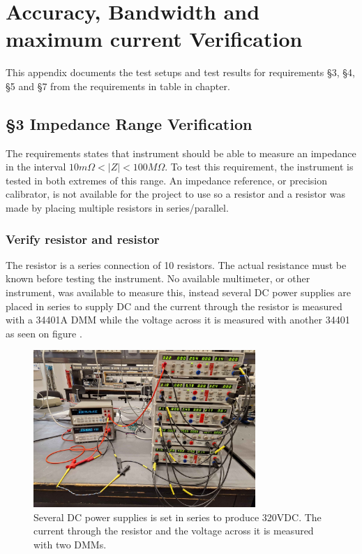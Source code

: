\chapter{Accuracy, Bandwidth and maximum current Verification} \label{App:AccuracyBWTest}
This appendix documents the test setups and test results for requirements §3, §4, §5 and §7 from the requirements in table  in chapter.

\section{§3 Impedance Range Verification} \label{subsec:ZRangeVerify} 
The requirements states that instrument should be able to measure an impedance in the interval $10m\Omega < |Z| < 100M \Omega$. To test this requirement, the instrument is tested in both extremes of this range. An impedance reference, or precision calibrator, is not available for the project to use so a  resistor and a  resistor was made by placing multiple resistors in series/parallel.

\subsection{Verify  resistor and  resistor}

The  resistor is a series connection of 10  resistors. The actual resistance must be known before testing the instrument. No available multimeter, or other instrument, was available to measure this, instead several DC power supplies are placed in series to supply DC and the current through the resistor is measured with a 34401A DMM while the voltage across it is measured with another 34401 as seen on figure .

\begin{figure}[H]
    \centering
    \includegraphics[clip, trim=0 0 0 0, width=0.75\textwidth]{Appendix/Figures/A_Z_100MegSetup.pdf}
    \caption{Several DC power supplies is set in series to produce 320VDC. The current through the resistor and the voltage across it is measured with two DMMs.}
    \label{fig:App_A_Z_100MEGSetup}
\end{figure}

